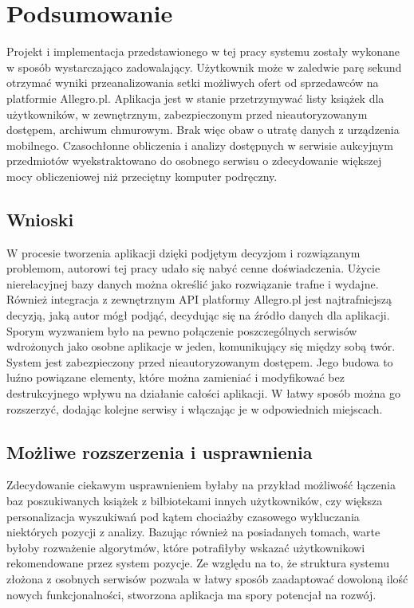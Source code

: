 \chapter{Podsumowanie}
\label{cha:podsumowanie}

Projekt i implementacja przedstawionego w tej pracy systemu zostały wykonane w sposób wystarczająco zadowalający. Użytkownik może w zaledwie parę sekund otrzymać wyniki przeanalizowania setki możliwych ofert od sprzedawców na platformie Allegro.pl. Aplikacja jest w stanie przetrzymywać listy książek dla użytkowników, w zewnętrznym, zabezpieczonym przed nieautoryzowanym dostępem, archiwum chmurowym. Brak więc obaw o utratę danych z urządzenia mobilnego. Czasochłonne obliczenia i analizy dostępnych w serwisie aukcyjnym przedmiotów wyekstraktowano do osobnego serwisu o zdecydowanie większej mocy obliczeniowej niż przeciętny komputer podręczny.

\section{Wnioski}
W procesie tworzenia aplikacji dzięki podjętym decyzjom i rozwiązanym problemom, autorowi tej pracy udało się nabyć cenne doświadczenia. 
Użycie nierelacyjnej bazy danych można określić jako rozwiązanie trafne i wydajne. Również integracja z zewnętrznym API platformy Allegro.pl jest najtrafniejszą decyzją, jaką autor mógł podjąć, decydując się na źródło danych dla aplikacji.
Sporym wyzwaniem było na pewno połączenie poszczególnych serwisów wdrożonych jako osobne aplikacje w jeden, komunikujący się między sobą twór.
System jest zabezpieczony przed nieautoryzowanym dostępem. Jego budowa to luźno powiązane elementy, które można zamieniać i modyfikować bez destrukcyjnego wpływu na działanie całości aplikacji.
W łatwy sposób można go rozszerzyć, dodając kolejne serwisy i włączając je w odpowiednich miejscach.

\newpage
\section{Możliwe rozszerzenia i usprawnienia}
Zdecydowanie ciekawym usprawnieniem byłaby na przykład możliwość łączenia baz poszukiwanych książek z bilbiotekami innych użytkowników, czy większa personalizacja wyszukiwań pod kątem chociażby czasowego wykluczania niektórych pozycji z analizy.
Bazując również na posiadanych tomach, warte byłoby rozważenie algorytmów, które potrafiłyby wskazać użytkownikowi rekomendowane przez system pozycje.
Ze względu na to, że struktura systemu złożona z osobnych serwisów pozwala w łatwy sposób zaadaptować dowoloną ilość nowych funkcjonalności, stworzona aplikacja ma spory potencjał na rozwój.